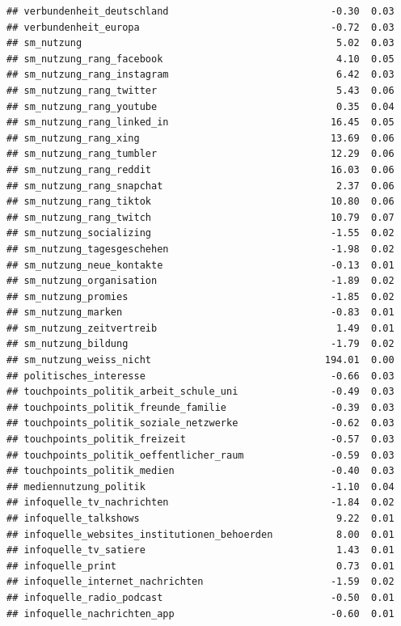 \documentclass[
]{book}
\begin{document}
\begin{verbatim}
## verbundenheit_deutschland                            -0.30  0.03
## verbundenheit_europa                                 -0.72  0.03
## sm_nutzung                                            5.02  0.03
## sm_nutzung_rang_facebook                              4.10  0.05
## sm_nutzung_rang_instagram                             6.42  0.03
## sm_nutzung_rang_twitter                               5.43  0.06
## sm_nutzung_rang_youtube                               0.35  0.04
## sm_nutzung_rang_linked_in                            16.45  0.05
## sm_nutzung_rang_xing                                 13.69  0.06
## sm_nutzung_rang_tumbler                              12.29  0.06
## sm_nutzung_rang_reddit                               16.03  0.06
## sm_nutzung_rang_snapchat                              2.37  0.06
## sm_nutzung_rang_tiktok                               10.80  0.06
## sm_nutzung_rang_twitch                               10.79  0.07
## sm_nutzung_socializing                               -1.55  0.02
## sm_nutzung_tagesgeschehen                            -1.98  0.02
## sm_nutzung_neue_kontakte                             -0.13  0.01
## sm_nutzung_organisation                              -1.89  0.02
## sm_nutzung_promies                                   -1.85  0.02
## sm_nutzung_marken                                    -0.83  0.01
## sm_nutzung_zeitvertreib                               1.49  0.01
## sm_nutzung_bildung                                   -1.79  0.02
## sm_nutzung_weiss_nicht                              194.01  0.00
## politisches_interesse                                -0.66  0.03
## touchpoints_politik_arbeit_schule_uni                -0.49  0.03
## touchpoints_politik_freunde_familie                  -0.39  0.03
## touchpoints_politik_soziale_netzwerke                -0.62  0.03
## touchpoints_politik_freizeit                         -0.57  0.03
## touchpoints_politik_oeffentlicher_raum               -0.59  0.03
## touchpoints_politik_medien                           -0.40  0.03
## mediennutzung_politik                                -1.10  0.04
## infoquelle_tv_nachrichten                            -1.84  0.02
## infoquelle_talkshows                                  9.22  0.01
## infoquelle_websites_institutionen_behoerden           8.00  0.01
## infoquelle_tv_satiere                                 1.43  0.01
## infoquelle_print                                      0.73  0.01
## infoquelle_internet_nachrichten                      -1.59  0.02
## infoquelle_radio_podcast                             -0.50  0.01
## infoquelle_nachrichten_app                           -0.60  0.01

\end{verbatim}
\end{document}
